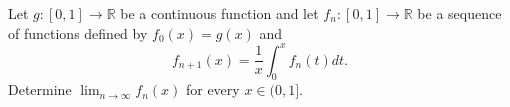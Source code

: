 Let \(g\colon [0,1]\to \mathbb{R}\) be a continuous function and let \(f_{n}\colon [0,1]\to \mathbb{R}\) be a
sequence of functions defined by \(f_{0}(x)=g(x)\) and
\[f_{n+1}(x)=\frac{1}{x}\int_{0}^{x}f_{n}(t)dt.\]Determine \(\lim_{n\to \infty}f_{n}(x)\) for every \(x\in (0,1]\).